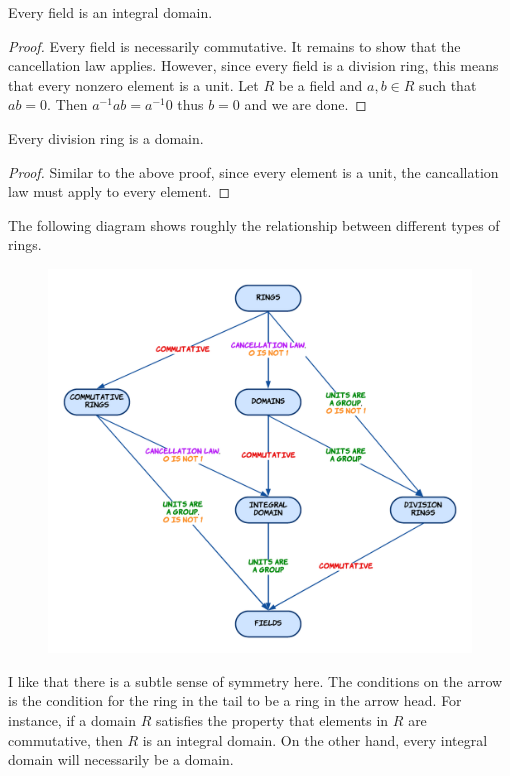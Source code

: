 \documentclass[a4paper]{article}
\begin{document}
\begin{prp}{}{} Every field is an integral domain. \tcbline
\begin{proof}
Every field is necessarily commutative. It remains to show that the cancellation law applies. However, since every field is a division ring, this means that every nonzero element is a unit. Let $R$ be a field and $a,b\in R$ such that $ab=0$. Then $a^{-1}ab=a^{-1}0$ thus $b=0$ and we are done. 
\end{proof}
\end{prp}

\begin{prp}{}{} Every division ring is a domain. \tcbline
\begin{proof}
Similar to the above proof, since every element is a unit, the cancallation law must apply to every element. 
\end{proof}
\end{prp}

The following diagram shows roughly the relationship between different types of rings. 

\begin{figure}[h]
\includegraphics[scale = 0.3]{Ring Diagram}
\centering
\end{figure}

I like that there is a subtle sense of symmetry here. The conditions on the arrow is the condition for the ring in the tail to be a ring in the arrow head. For instance, if a domain $R$ satisfies the property that elements in $R$ are commutative, then $R$ is an integral domain. On the other hand, every integral domain will necessarily be a domain. 
\end{document}
